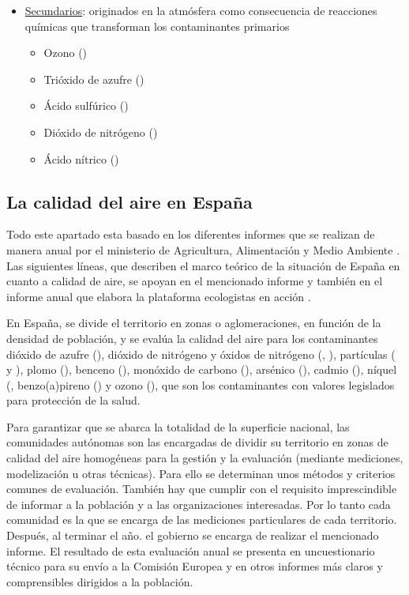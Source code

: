 \begin{itemize}
\begin{itemize}
 	\end{itemize}
 	\item \underline{Secundarios}: originados en la atmósfera como consecuencia de reacciones químicas que transforman los contaminantes primarios
 	\begin{itemize}
 \item	Ozono ()
 \item	Trióxido de azufre ()
 \item	Ácido sulfúrico ()
 \item	Dióxido de nitrógeno ()
 \item	Ácido nítrico ()
 	\end{itemize}
 \end{itemize}

\subsection{La calidad del aire en España}

Todo este apartado esta basado en los diferentes informes que se realizan de manera anual por el ministerio de Agricultura, Alimentación y Medio Ambiente \cite{informe_2018}. Las siguientes líneas, que describen el marco teórico de la situación de España en cuanto a calidad de aire, se apoyan en el mencionado informe y también en el informe anual que elabora la plataforma ecologistas en acción \cite{informe_ecologistas}.

 En España, se divide el territorio en zonas o aglomeraciones, en función de la densidad de población, y se evalúa la calidad del aire para los contaminantes dióxido de azufre (), dióxido de nitrógeno y óxidos de nitrógeno (, ), partículas ( y ), plomo (), benceno (), monóxido de carbono (), arsénico (), cadmio (), níquel (, benzo(a)pireno () y ozono (), que son los contaminantes con valores legislados para protección de la salud.
 
 Para garantizar que se abarca la totalidad de la superficie nacional, las comunidades autónomas son las encargadas de dividir su territorio en zonas de calidad del aire homogéneas para la gestión y la evaluación (mediante mediciones, modelización u otras técnicas). Para ello se determinan unos métodos y criterios comunes de evaluación. También hay que cumplir con el requisito imprescindible de informar a la población y a las organizaciones interesadas. Por lo tanto cada comunidad es la que se encarga de las mediciones particulares de cada territorio. Después, al terminar el año. el gobierno se encarga de realizar el mencionado informe. El resultado de esta evaluación anual se presenta en uncuestionario técnico para su envío a la Comisión Europea y en otros informes más claros y comprensibles dirigidos a la población.
 
